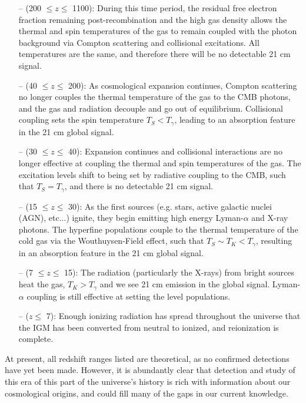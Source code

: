 \begin{itemize}
    \item[--] (200 $\leq z \leq$ 1100): During this time period, the residual 
     free electron fraction remaining post-recombination and the high gas 
     density allows the thermal and spin temperatures of the gas to remain 
     coupled with the photon background via Compton scattering and collisional 
     excitations. All temperatures are the same, and therefore there will be no 
     detectable 21 cm signal.
    \item[--] (40 $\leq z \leq$ 200): As cosmological expansion continues, 
     Compton scattering no longer couples the thermal temperature of the gas to 
     the CMB photons, and the gas and radiation decouple and go out of 
     equilibrium.  Collisional coupling sets the spin temperature $T_S < 
     T_\gamma$, leading to an absorption feature in the 21 cm global signal.  
    \item[--] (30 $\leq z \leq$ 40): Expansion continues and collisional 
     interactions are no longer effective at coupling the thermal and spin 
     temperatures of the gas. The excitation levels shift to being set by 
     radiative coupling to the CMB, such that $T_S = T_\gamma$, and there is no 
     detectable 21 cm signal.
    \item[--] (15 $\leq z \leq$ 30): As the first sources (e.g. stars, active 
     galactic nuclei (AGN), etc...) ignite, they begin emitting high energy 
     Lyman-$\alpha$ and X-ray photons. The hyperfine populations couple to the 
     thermal temperature of the cold gas via the Wouthuysen-Field effect, such 
     that $T_S \sim T_K < T_\gamma$, resulting in an absorption feature in the 
     21 cm global signal.
    \item[--] (7 $\leq z \leq$ 15): The radiation (particularly the X-rays) 
     from bright sources heat the gas, $T_K > T_\gamma$ and we see 21 cm 
     emission in the global signal. Lyman-$\alpha$ coupling is still effective 
     at setting the level populations.
    \item[--] ($z \leq$ 7): Enough ionizing radiation has spread throughout the 
     universe that the IGM has been converted from neutral to ionized, and 
     reionization is complete.
\end{itemize}

At present, all redshift ranges listed are theoretical, as no confirmed 
detections have yet been made. However, it is abundantly clear that detection 
and study of this era of this part of the universe's history is rich with 
information about our cosmological origins, and could fill many of the gaps in 
our current knowledge.
